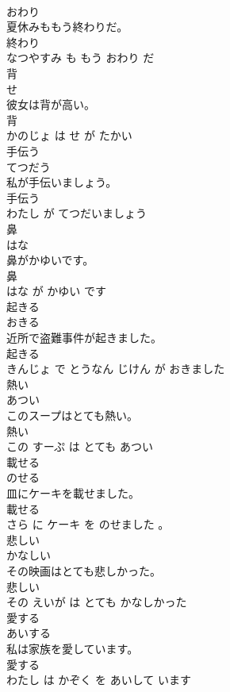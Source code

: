 \documentclass[8pt]{extreport}
\begin{document}
\begin{CJK}{UTF8}{min}
\\	おわり			
\\	夏休みももう終わりだ。	
\\	終わり 
\\	なつやすみ も もう おわり だ			
\\	背	
\\	せ			
\\	彼女は背が高い。	
\\	背 
\\	かのじょ は せ が たかい			
\\	手伝う	
\\	てつだう			
\\	私が手伝いましょう。	
\\	手伝う 
\\	わたし が てつだいましょう			
\\	鼻	
\\	はな			
\\	鼻がかゆいです。	
\\	鼻 
\\	はな が かゆい です			
\\	起きる	
\\	おきる			
\\	近所で盗難事件が起きました。	
\\	起きる 
\\	きんじょ で とうなん じけん が おきました			
\\	熱い	
\\	あつい			
\\	このスープはとても熱い。	
\\	熱い 
\\	この すーぷ は とても あつい			
\\	載せる	
\\	のせる			
\\	皿にケーキを載せました。	
\\	載せる 
\\	さら に ケーキ を のせました 。			
\\	悲しい	
\\	かなしい			
\\	その映画はとても悲しかった。	
\\	悲しい 
\\	その えいが は とても かなしかった			
\\	愛する	
\\	あいする			
\\	私は家族を愛しています。	
\\	愛する 
\\	わたし は かぞく を あいして います			

\end{CJK}
\end{document}
